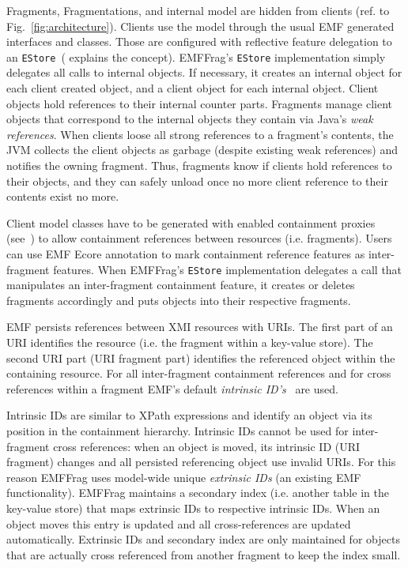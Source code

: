 Fragments, Fragmentations, and internal model are hidden from clients (ref. to Fig.~\ref{fig:architecture}). Clients use the model through the usual EMF generated interfaces and classes. Those are configured with reflective feature delegation to an \texttt{EStore}~(\cite{emf2009} explains the concept). 
EMFFrag's \texttt{EStore} implementation simply delegates all calls to internal objects. If necessary, it creates an internal object for each client created object, and a client object for each internal object. Client objects hold references to their internal counter parts. Fragments manage client objects that correspond to the internal objects they contain via Java's \emph{weak references}. When clients loose all strong references to a fragment's contents,  the JVM collects the client objects as garbage (despite existing weak references) and notifies the owning fragment. Thus, fragments know if clients hold references to their objects, and they can safely unload once no more client reference to their contents exist no more.

Client model classes have to be generated with enabled containment proxies (see~\cite{emf2009}) to allow containment references between resources (i.e. fragments). Users can use EMF Ecore annotation to mark containment reference features as inter-fragment features.
When EMFFrag's \texttt{EStore} implementation delegates a call that manipulates an inter-fragment containment feature, it creates or deletes fragments accordingly and puts objects into their respective fragments.

EMF persists references between XMI resources with URIs. The first part of an URI identifies the resource (i.e. the fragment within a key-value store). The second URI part (URI fragment part) identifies the referenced object within the containing resource. For all inter-fragment containment references and for cross references within a fragment EMF's default \emph{intrinsic ID's}~\cite{emf2009} are used.

Intrinsic IDs are similar to XPath expressions and identify an object via its position in the containment hierarchy. Intrinsic IDs cannot be used for inter-fragment cross references: when an object is moved, its intrinsic ID (URI fragment) changes and all persisted referencing object use invalid URIs. For this reason EMFFrag uses model-wide unique \emph{extrinsic IDs} (an existing EMF functionality). EMFFrag maintains a secondary index (i.e. another table in the key-value store) that maps extrinsic IDs to respective intrinsic IDs. When an object moves this entry is updated and all cross-references are updated automatically. Extrinsic IDs and secondary index are only maintained for objects that are actually cross referenced from another fragment to keep the index small. 